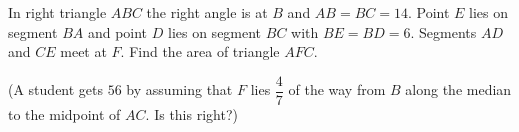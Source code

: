 In right triangle $ABC$ the right angle is at $B$ and $AB=BC=14$. Point $E$ lies on segment $BA$ and point $D$ lies on segment $BC$ with $BE=BD=6$. Segments $AD$ and $CE$ meet at $F$. Find the area of triangle $AFC$.

(A student gets $56$ by assuming that $F$ lies $\dfrac{4}{7}$ of the way from $B$ along the median to the midpoint of $AC$. Is this right?)

